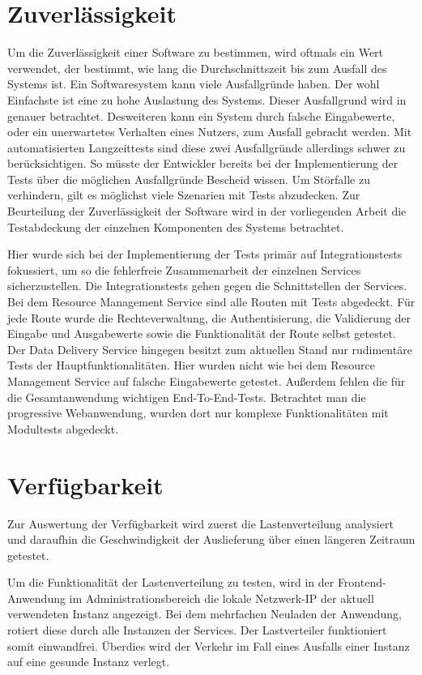 \section{Zuverlässigkeit}
\label{sec:zuverlaessigkeit}
Um die Zuverlässigkeit einer Software zu bestimmen, wird oftmals ein Wert verwendet,
der bestimmt, wie lang die Durchschnittszeit bis zum Ausfall des Systems ist.\cite[S. 9]{SoftwareQualitaet}
Ein Softwaresystem kann viele Ausfallgründe haben. Der wohl Einfachste ist eine zu hohe Auslastung des Systems.
Dieser Ausfallgrund wird in  genauer betrachtet. Desweiteren kann ein System durch falsche
Eingabewerte, oder ein unerwartetes Verhalten eines Nutzers, zum Ausfall gebracht werden. Mit automatisierten Langzeittests
sind diese zwei Ausfallgründe allerdings schwer zu berücksichtigen. So müsste der Entwickler bereits bei der Implementierung
der Tests über die möglichen Ausfallgründe Bescheid wissen. Um Störfalle zu verhindern, gilt es möglichst viele Szenarien mit
Tests abzudecken. Zur Beurteilung der Zuverlässigkeit der Software wird in der vorliegenden Arbeit die
Testabdeckung der einzelnen Komponenten des Systems betrachtet.

Hier wurde sich bei der Implementierung der Tests primär auf Integrationstests fokussiert, um so die fehlerfreie 
Zusammenarbeit der einzelnen Services sicherzustellen. Die Integrationstests gehen gegen die Schnittstellen der Services.
Bei dem Resource Management Service sind alle Routen mit Tests abgedeckt. Für jede Route wurde die Rechteverwaltung,
die Authentisierung, die Validierung der Eingabe und Ausgabewerte sowie die Funktionalität der Route selbst getestet.
Der Data Delivery Service hingegen besitzt zum aktuellen Stand nur rudimentäre Tests der Hauptfunktionalitäten.
Hier wurden nicht wie bei dem Resource Management Service auf falsche Eingabewerte getestet. Außerdem fehlen die für
die Gesamtanwendung wichtigen End-To-End-Tests. Betrachtet man die progressive Webanwendung, wurden dort nur komplexe
Funktionalitäten mit Modultests abgedeckt.

\section{Verfügbarkeit}
\label{sec:verfuegbarkeit}
Zur Auswertung der Verfügbarkeit wird zuerst die Lastenverteilung analysiert und daraufhin
die Geschwindigkeit der Auslieferung über einen längeren Zeitraum getestet.

Um die Funktionalität der Lastenverteilung zu testen, wird in der Frontend-Anwendung
im Administrationsbereich die lokale Netzwerk-IP der aktuell verwendeten Instanz
angezeigt. Bei dem mehrfachen Neuladen der Anwendung, rotiert diese
durch alle Instanzen der Services. Der Lastverteiler funktioniert somit einwandfrei.
Überdies wird der Verkehr im Fall eines Ausfalls einer Instanz auf eine gesunde
Instanz verlegt.

